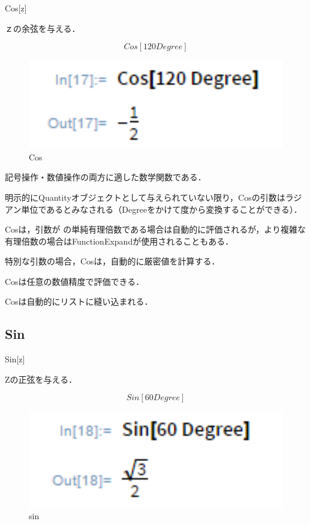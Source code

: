 Cos[z]

ｚの余弦を与える．

\[Cos[120 Degree]\]

\begin{figure}[h]
\centering
\includegraphics[width=15cm]{cos.png}
\caption{Cos}\label{図}
\end{figure}

記号操作・数値操作の両方に適した数学関数である．

明示的にQuantityオブジェクトとして与えられていない限り，Cosの引数はラジアン単位であるとみなされる（Degreeをかけて度から変換することができる）． 

Cosは，引数が  の単純有理倍数である場合は自動的に評価されるが，より複雑な有理倍数の場合はFunctionExpandが使用されることもある． 

特別な引数の場合，Cosは，自動的に厳密値を計算する．

Cosは任意の数値精度で評価できる．

Cosは自動的にリストに縫い込まれる．

\subsection {Sin}

Sin[z]

Zの正弦を与える．

\[Sin[60 Degree]\]

\begin{figure}[h]
\centering
\includegraphics[width=15cm]{sin.png}
\caption{sin}\label{図}
\end{figure}

